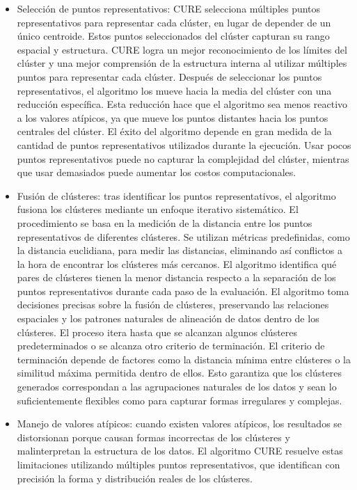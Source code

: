 \begin{itemize}
  \item Selecci\'on de puntos representativos: CURE selecciona m\'ultiples puntos representativos para representar cada cl\'uster, en lugar de depender de un \'unico centroide. Estos puntos seleccionados del cl\'uster capturan su rango espacial y estructura. CURE logra un mejor reconocimiento de los l\'imites del cl\'uster y una mejor comprensi\'on de la estructura interna al utilizar m\'ultiples puntos para representar cada cl\'uster. Despu\'es de seleccionar los puntos representativos, el algoritmo los mueve hacia la media del cl\'uster con una reducci\'on espec\'ifica. Esta reducci\'on hace que el algoritmo sea menos reactivo a los valores at\'ipicos, ya que mueve los puntos distantes hacia los puntos centrales del cl\'uster. El \'exito del algoritmo depende en gran medida de la cantidad de puntos representativos utilizados durante la ejecuci\'on. Usar pocos puntos representativos puede no capturar la complejidad del cl\'uster, mientras que usar demasiados puede aumentar los costos computacionales.
  \item Fusi\'on de cl\'usteres: tras identificar los puntos representativos, el algoritmo fusiona los cl\'usteres mediante un enfoque iterativo sistem\'atico. El procedimiento se basa en la medici\'on de la distancia entre los puntos representativos de diferentes cl\'usteres. Se utilizan m\'etricas predefinidas, como la distancia euclidiana, para medir las distancias, eliminando as\'i conflictos a la hora de encontrar los cl\'usteres m\'as cercanos. El algoritmo identifica qu\'e pares de cl\'usteres tienen la menor distancia respecto a la separaci\'on de los puntos representativos durante cada paso de la evaluaci\'on. El algoritmo toma decisiones precisas sobre la fusi\'on de cl\'usteres, preservando las relaciones espaciales y los patrones naturales de alineaci\'on de datos dentro de los cl\'usteres. El proceso itera hasta que se alcanzan algunos cl\'usteres predeterminados o se alcanza otro criterio de terminaci\'on. El criterio de terminaci\'on depende de factores como la distancia m\'inima entre cl\'usteres o la similitud m\'axima permitida dentro de ellos. Esto garantiza que los cl\'usteres generados correspondan a las agrupaciones naturales de los datos y sean lo suficientemente flexibles como para capturar formas irregulares y complejas.
  \item Manejo de valores at\'ipicos: cuando existen valores at\'ipicos, los resultados se distorsionan porque causan formas incorrectas de los cl\'usteres y malinterpretan la estructura de los datos. El algoritmo CURE resuelve estas limitaciones utilizando m\'ultiples puntos representativos, que identifican con precisi\'on la forma y distribuci\'on reales de los cl\'usteres.
\end{itemize}

